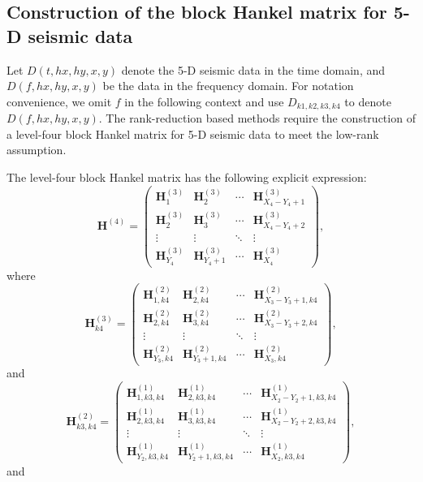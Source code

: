 \subsection{Construction of the block Hankel matrix for 5-D seismic data}
Let $D(t,hx,hy,x,y)$ denote the 5-D seismic data in the time domain, and $D(f,hx,hy,x,y)$ be the data in the frequency domain. For notation convenience, we omit $f$ in the following context and use $D_{k1,k2,k3,k4}$ to denote $D(f,hx,hy,x,y)$. The  rank-reduction based methods require the construction of a level-four block Hankel matrix for 5-D seismic data to meet the low-rank assumption.  

The level-four block Hankel matrix has the following explicit expression:
\begin{equation}
\label{eq:levelfour}
\mathbf{H}^{(4)}=\left(\begin{array}{cccc}
\mathbf{H}_{1}^{(3)} & \mathbf{H}_{2}^{(3)} & \cdots & \mathbf{H}_{X_4-Y_4+1}^{(3)} \\
\mathbf{H}_{2}^{(3)} & \mathbf{H}_{3}^{(3)}  &\cdots & \mathbf{H}_{X_4-Y_4+2}^{(3)} \\
\vdots & \vdots &\ddots &\vdots \\
\mathbf{H}_{Y_4}^{(3)}&\mathbf{H}_{Y_4+1}^{(3)} &\cdots& \mathbf{H}_{X_4}^{(3)}
\end{array}
\right),
\end{equation}
where 
\begin{equation}
\label{eq:levelthree}
\mathbf{H}_{k4}^{(3)}=\left(\begin{array}{cccc}
\mathbf{H}_{1,k4}^{(2)} & \mathbf{H}_{2,k4}^{(2)} & \cdots &\mathbf{H}_{X_3-Y_3+1,k4}^{(2)} \\
\mathbf{H}_{2,k4}^{(2)} & \mathbf{H}_{3,k4}^{(2)}  &\cdots &\mathbf{H}_{X_3-Y_3+2,k4}^{(2)} \\
\vdots & \vdots &\ddots &\vdots \\
\mathbf{H}_{Y_3,k4}^{(2)}&\mathbf{H}_{Y_3+1,k4}^{(2)} &\cdots&\mathbf{H}_{X_3,k4}^{(2)}
\end{array}
\right),
\end{equation}
and 
\begin{equation}
\label{eq:leveltwo}
\mathbf{H}_{k3,k4}^{(2)}=\left(\begin{array}{cccc}
\mathbf{H}_{1,k3,k4}^{(1)} & \mathbf{H}_{2,k3,k4}^{(1)} & \cdots &\mathbf{H}_{X_2-Y_2+1,k3,k4}^{(1)} \\
\mathbf{H}_{2,k3,k4}^{(1)} & \mathbf{H}_{3,k3,k4}^{(1)}  &\cdots &\mathbf{H}_{X_2-Y_2+2,k3,k4}^{(1)} \\
\vdots & \vdots &\ddots &\vdots \\
\mathbf{H}_{Y_2,k3,k4}^{(1)}&\mathbf{H}_{Y_2+1,k3,k4}^{(1)} &\cdots&\mathbf{H}_{X_2,k3,k4}^{(1)}
\end{array}
\right),
\end{equation}
and

